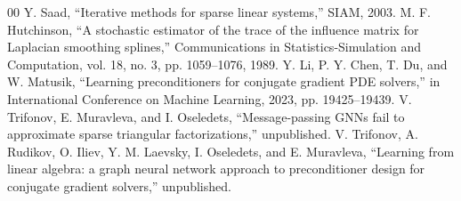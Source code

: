 \documentclass[conference]{IEEEtran}
\begin{document}



\begin{thebibliography}{00}
 Y. Saad, ``Iterative methods for sparse linear systems,'' SIAM, 2003.
 M. F. Hutchinson, ``A stochastic estimator of the trace of the influence matrix for Laplacian smoothing splines,'' Communications in Statistics-Simulation and Computation, vol. 18, no. 3, pp. 1059--1076, 1989.
 Y. Li, P. Y. Chen, T. Du, and W. Matusik, ``Learning preconditioners for conjugate gradient PDE solvers,'' in International Conference on Machine Learning, 2023, pp. 19425--19439.
 V. Trifonov, E. Muravleva, and I. Oseledets, ``Message-passing GNNs fail to approximate sparse triangular factorizations,'' unpublished.
 V. Trifonov, A. Rudikov, O. Iliev, Y. M. Laevsky, I. Oseledets, and E. Muravleva, ``Learning from linear algebra: a graph neural network approach to preconditioner design for conjugate gradient solvers,'' unpublished.
\end{thebibliography}

\end{document}
